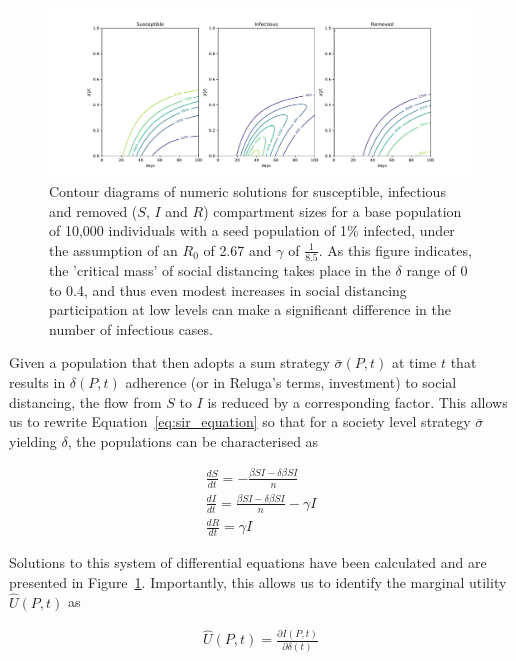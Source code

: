 \documentclass{article}
\begin{document}
\begin{figure}
	\includegraphics[width=\linewidth]{figures/fig3-SIR-by-delta}
	\caption{Contour diagrams of numeric solutions for susceptible, infectious and removed ($S$, $I$ and $R$) compartment sizes for a base population of 10,000 individuals with a seed population of 1\% infected, under the assumption of an $R_0$ of 2.67 and $\gamma$ of $\frac{1}{8.5}$. As this figure indicates, the 'critical mass' of social distancing takes place in the $\delta$ range of 0 to 0.4, and thus even modest increases in social distancing participation at low levels can make a significant difference in the number of infectious cases.}
	\label{fig:fig3-SIR-by-delta}
\end{figure}

Given a population that then adopts a sum strategy $\bar{\sigma}(P, t)$ at time $t$ that results in $\delta(P, t)$ adherence (or in Reluga's terms, investment) to social distancing, the flow from $S$ to $I$ is reduced by a corresponding factor. This allows us to rewrite Equation~\eqref{eq:sir_equation} so that for a society level strategy $\bar{\sigma}$ yielding $\delta$, the populations can be characterised as

\begin{equation}
	\begin{aligned}
		\frac{dS}{dt} = - \frac{\beta S I - \delta \beta S I}{n} 			\\
		\frac{dI}{dt} = \frac{\beta S I - \delta \beta S I}{n} - \gamma I	\\
		\frac{dR}{dt} = \gamma I
	\end{aligned}
	\label{eq:sir_with_social_distancing}
\end{equation}

Solutions to this system of differential equations have been calculated and are presented in Figure~\ref{fig:fig3-SIR-by-delta}. Importantly, this allows us to identify the marginal utility $\hat{U}(P, t)$ as

\begin{equation}
	\begin{aligned}
		\hat{U}(P, t) = \frac{\partial I(P, t)}{\partial \delta(t)}
	\end{aligned}
	\label{eq:marginal_utility}
\end{equation}
\end{document}
